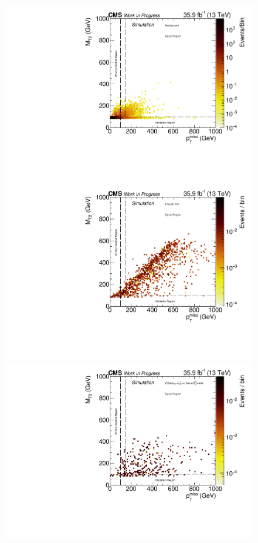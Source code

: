 \begin{figure}[tbp]
 \centering
 \includegraphics[width=\pairwidth]{figures/plots_2d/DataMC_sameHistograms_LL+signal_onZ__LL__MetMt2_bkg_}
 \includegraphics[width=\pairwidth]{figures/plots_2d/DataMC_sameHistograms_LL+signal_onZ__LL__MetMt2_SIG_tching600_}\\
 \includegraphics[width=\pairwidth]{figures/plots_2d/DataMC_sameHistograms_LL+signal_onZ__LL__MetMt2_SIG_t5bbbbzg_1500_400_}

\end{figure}
